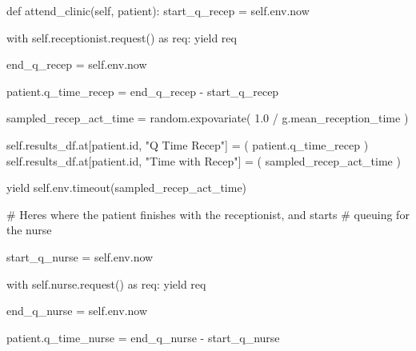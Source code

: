 \documentclass[
  letterpaper,
  DIV=11,
  numbers=noendperiod]{scrreprt}
\newenvironment{Shaded}{}{}
\newcommand{\BuiltInTok}[1]{\textcolor[rgb]{0.84,0.23,0.29}{#1}}
\newcommand{\CommentTok}[1]{\textcolor[rgb]{0.42,0.45,0.49}{#1}}
\newcommand{\ControlFlowTok}[1]{\textcolor[rgb]{0.84,0.23,0.29}{#1}}
\newcommand{\FloatTok}[1]{\textcolor[rgb]{0.00,0.36,0.77}{#1}}
\newcommand{\ImportTok}[1]{\textcolor[rgb]{0.01,0.18,0.38}{#1}}
\newcommand{\KeywordTok}[1]{\textcolor[rgb]{0.84,0.23,0.29}{#1}}
\newcommand{\NormalTok}[1]{\textcolor[rgb]{0.14,0.16,0.18}{#1}}
\newcommand{\OperatorTok}[1]{\textcolor[rgb]{0.14,0.16,0.18}{#1}}
\newcommand{\StringTok}[1]{\textcolor[rgb]{0.01,0.18,0.38}{#1}}
\newcommand{\VariableTok}[1]{\textcolor[rgb]{0.89,0.38,0.04}{#1}}
\begin{document}
\begin{Shaded}
\begin{Highlighting}[]
\KeywordTok{def}\NormalTok{ attend\_clinic(}\VariableTok{self}\NormalTok{, patient):}
\NormalTok{        start\_q\_recep }\OperatorTok{=} \VariableTok{self}\NormalTok{.env.now}

        \ControlFlowTok{with} \VariableTok{self}\NormalTok{.receptionist.request() }\ImportTok{as}\NormalTok{ req:}
            \ControlFlowTok{yield}\NormalTok{ req}

\NormalTok{            end\_q\_recep }\OperatorTok{=} \VariableTok{self}\NormalTok{.env.now}

\NormalTok{            patient.q\_time\_recep }\OperatorTok{=}\NormalTok{ end\_q\_recep }\OperatorTok{{-}}\NormalTok{ start\_q\_recep}

\NormalTok{            sampled\_recep\_act\_time }\OperatorTok{=}\NormalTok{ random.expovariate(}
                \FloatTok{1.0} \OperatorTok{/}\NormalTok{ g.mean\_reception\_time}
\NormalTok{            )}

            \VariableTok{self}\NormalTok{.results\_df.at[patient.}\BuiltInTok{id}\NormalTok{, }\StringTok{"Q Time Recep"}\NormalTok{] }\OperatorTok{=}\NormalTok{ (}
\NormalTok{                 patient.q\_time\_recep}
\NormalTok{            )}
            \VariableTok{self}\NormalTok{.results\_df.at[patient.}\BuiltInTok{id}\NormalTok{, }\StringTok{"Time with Recep"}\NormalTok{] }\OperatorTok{=}\NormalTok{ (}
\NormalTok{                 sampled\_recep\_act\_time}
\NormalTok{            )}

            \ControlFlowTok{yield} \VariableTok{self}\NormalTok{.env.timeout(sampled\_recep\_act\_time)}

        \CommentTok{\# Here\textquotesingle{}s where the patient finishes with the receptionist, and starts}
        \CommentTok{\# queuing for the nurse}

\NormalTok{        start\_q\_nurse }\OperatorTok{=} \VariableTok{self}\NormalTok{.env.now}

        \ControlFlowTok{with} \VariableTok{self}\NormalTok{.nurse.request() }\ImportTok{as}\NormalTok{ req:}
            \ControlFlowTok{yield}\NormalTok{ req}

\NormalTok{            end\_q\_nurse }\OperatorTok{=} \VariableTok{self}\NormalTok{.env.now}

\NormalTok{            patient.q\_time\_nurse }\OperatorTok{=}\NormalTok{ end\_q\_nurse }\OperatorTok{{-}}\NormalTok{ start\_q\_nurse}


\end{Highlighting}
\end{Shaded}
\end{document}
